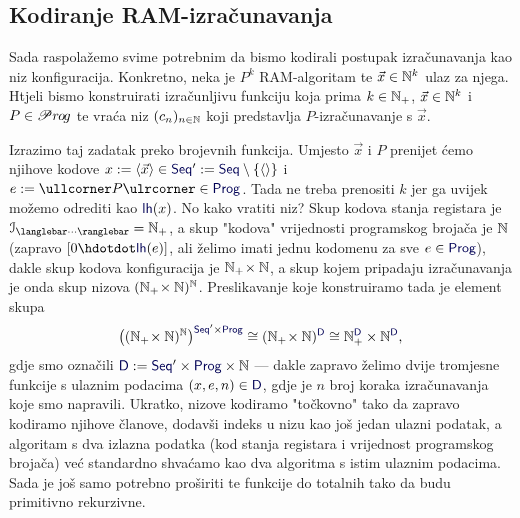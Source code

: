 \subsection{Kodiranje RAM-izračunavanja}

Sada raspolažemo svime potrebnim da bismo kodirali postupak iz\-ra\-ču\-na\-va\-nja kao niz konfiguracija. Konkretno, neka je $P^k$ RAM-algoritam te $\vec x\in{\mathbb N}^k$ ulaz za njega. Htjeli bismo konstruirati izračunljivu funkciju koja prima $k\in{\mathbb N}_+$, $\vec x\in{\mathbb N}^k$ i $P\in\mathscr Pr\mspace{-1mu}o\mspace{-2mu}g$ te vraća niz $(c_n)_{n\in{\mathbb N}}$ koji predstavlja $P$-izračunavanje s $\vec x$.

Izrazimo taj zadatak preko brojevnih funkcija. Umjesto $\vec x$ i $P$ prenijet ćemo njihove kodove $x:=\langle\vec x\rangle\in\f{Seq}':=\f{Seq}\setminus\{\langle\rangle\}$ i $e:=\kprog{P}\in\f{Prog}$. Tada ne treba prenositi $k$ jer ga uvijek možemo odrediti kao $\f{lh}(x)$. No kako vratiti niz? Skup kodova stanja registara je $\im{\knk{\cdots}}=\N_+$, a skup "kodova" vrijednosti programskog brojača je ${\mathbb N}$ (zapravo $[0\dd\f{lh}(e)]$, ali želimo imati jednu kodomenu za sve $e\in\f{Prog}$), dakle skup kodova konfiguracija je ${\mathbb N}_+\!\times{\mathbb N}$, a skup kojem pripadaju izračunavanja je onda skup nizova $({\mathbb N}_+\!\times{\mathbb N})^{\mathbb N}$. Preslikavanje koje konstruiramo tada je element skupa
\begin{equation}
    \bigl((\N_+\!\times\N)^\N\bigr)^{\f{Seq}'\times\f{Prog}}\cong
    (\N_+\!\times\N)^{\f D}\cong\N_+^{\f D}\times\N^{\f D}\text,
\end{equation}
gdje smo označili $\f D:=\f{Seq}'\times\f{Prog}\times\N$ --- dakle zapravo želimo dvije tromjesne funkcije s ulaznim podacima $(x,e,n)\in\f D$, gdje je $n$ broj koraka izračunavanja koje smo napravili. Ukratko, nizove kodiramo "točkovno" tako da zapravo kodiramo njihove članove, dodavši indeks u nizu kao još jedan ulazni podatak, a algoritam s dva izlazna podatka (kod stanja registara i vrijednost programskog brojača) već standardno shvaćamo kao dva algoritma s istim ulaznim podacima. Sada je još samo potrebno proširiti te funkcije do totalnih tako da budu primitivno rekurzivne.


